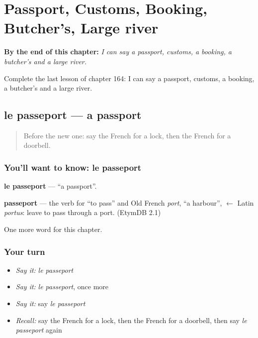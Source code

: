 
\chapter{Passport, Customs, Booking, Butcher's, Large river}
\label{ch:fr-passport-customs-booking-butcher-s-large-river}

\begin{chapteropening}
\textbf{By the end of this chapter:} \emph{I can say a passport, customs, a booking, a butcher's and a large river.}

Complete the last lesson of chapter 164: I can say a passport, customs, a booking, a butcher's and a large river.
\end{chapteropening}

\section[le passeport]{le passeport — a passport}

\label{lesson:FR-C164-passeport}



\begin{quote}
Before the new one: say the French for a lock, then the French for a doorbell.
\end{quote}

\subsection*{You'll want to know: le passeport}
\textbf{le passeport} — \textquotedblleft{}a passport\textquotedblright{}.

\begin{cousinweb}
\textbf{passeport} — the verb for \textquotedblleft{}to pass\textquotedblright{} and Old French \emph{port}, \textquotedblleft{}a harbour\textquotedblright{}, $\leftarrow$ Latin \emph{portus}: leave to pass through a port. (EtymDB 2.1)
\end{cousinweb}

\begin{grammarlens}[title={What you've built}]
One more word for this chapter.
\end{grammarlens}

\subsection*{Your turn}
\begin{itemize}
\raggedright
  \item \emph{Say it:} \emph{le passeport}
  \item \emph{Say it:} \emph{le passeport}, once more
  \item \emph{Say it:} say \emph{le passeport}
  \item \emph{Recall:} say the French for a lock, then the French for a doorbell, then say \emph{le passeport} again
\end{itemize}

